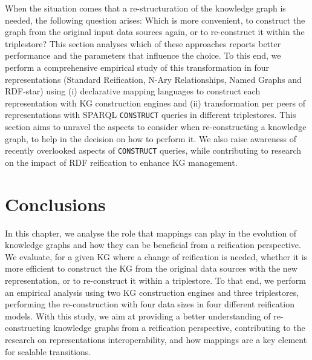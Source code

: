When the situation comes that a re-structuration of the knowledge graph is needed, the following question arises: Which is more convenient, to construct the graph from the original input data sources again, or to re-construct it within the triplestore? This section analyses which of these approaches reports better performance and the parameters that influence the choice. 
To this end, we perform a comprehensive empirical study of this transformation in four representations (Standard Reification, N-Ary Relationships, Named Graphs and RDF-star) using (i) declarative mapping languages to construct each representation with KG construction engines and (ii) transformation per peers of representations with SPARQL \texttt{CONSTRUCT} queries in different triplestores. This section aims to unravel the aspects to consider when re-constructing a knowledge graph, to help in the decision on how to perform it. We also raise awareness of recently overlooked aspects of \texttt{CONSTRUCT} queries, while contributing to research on the impact of RDF reification to enhance KG management.



\section{Conclusions}

In this chapter, we analyse the role that mappings can play in the evolution of knowledge graphs and how they can be beneficial from a reification perspective. We evaluate, for a given KG where a change of reification is needed, whether it is more efficient to construct the KG from the original data sources with the new representation, or to re-construct it within a triplestore. To that end, we perform an empirical analysis using two KG construction engines and three triplestores, performing the re-construction with four data sizes in four different reification models. 
With this study, we aim at providing a better understanding of re-constructing knowledge graphs from a reification perspective, contributing to the research on representations interoperability, and how mappings are a key element for scalable transitions. 

